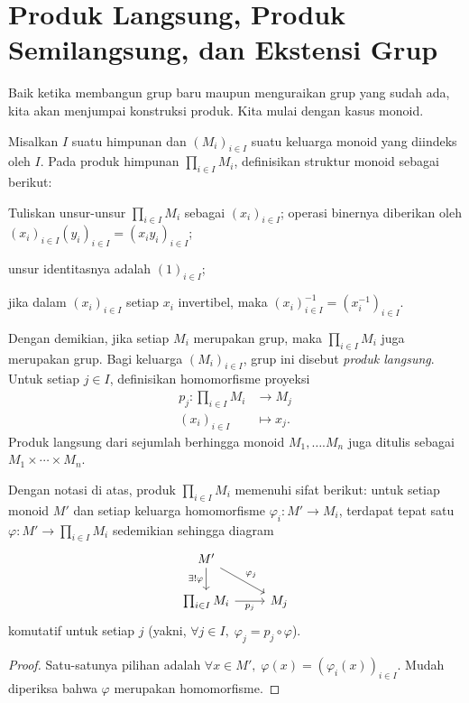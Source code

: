 \section{Produk Langsung, Produk Semilangsung, dan Ekstensi Grup}\label{sec:group-extensions}
Baik ketika membangun grup baru maupun menguraikan grup yang sudah ada, kita akan menjumpai konstruksi produk. Kita mulai dengan kasus monoid.

\begin{definition}\label{def:monoid-times}
	Misalkan $I$ suatu himpunan dan $(M_i)_{i \in I}$ suatu keluarga monoid yang diindeks oleh $I$. Pada produk himpunan $\prod_{i \in I} M_i$, definisikan struktur monoid sebagai berikut:
	\begin{compactitem}
		\item Tuliskan unsur-unsur $\prod_{i \in I} M_i$ sebagai $(x_i)_{i \in I}$; operasi binernya diberikan oleh $(x_i)_{i \in I} (y_i)_{i \in I} = (x_i y_i)_{i \in I}$;
		\item unsur identitasnya adalah $(1)_{i \in I}$;
		\item jika dalam $(x_i)_{i \in I}$ setiap $x_i$ invertibel, maka $(x_i)_{i \in I}^{-1} = (x_i^{-1})_{i \in I}$.
	\end{compactitem}
	Dengan demikian, jika setiap $M_i$ merupakan grup, maka $\prod_{i \in I} M_i$ juga merupakan grup. Bagi keluarga $(M_i)_{i \in I}$, grup ini disebut \emph{produk langsung}. Untuk setiap $j \in I$, definisikan homomorfisme proyeksi
	\begin{align*}
		p_j: \prod_{i \in I} M_i & \longrightarrow M_j \\
		(x_i)_{i \in I} & \longmapsto x_j.
	\end{align*}
	Produk langsung dari sejumlah berhingga monoid $M_1, \ldots. M_n$ juga ditulis sebagai $M_1 \times \cdots \times M_n$.
\end{definition}

\begin{lemma}\label{prop:product-monoid-univ-prop}
	Dengan notasi di atas, produk $\prod_{i \in I} M_i$ memenuhi sifat berikut: untuk setiap monoid $M'$ dan setiap keluarga homomorfisme $\varphi_i: M' \to M_i$, terdapat tepat satu $\varphi: M' \to \prod_{i \in I} M_i$ sedemikian sehingga diagram
	\[ \begin{tikzcd}
		M' \arrow[rd, "\varphi_j"] \arrow[d, "{\exists! \varphi}"'] & \\
		\prod_{i \in I} M_i \arrow[r, "p_j"'] & M_j
	\end{tikzcd} \]
	komutatif untuk setiap $j$ (yakni, $\forall j \in I, \; \varphi_j = p_j \circ \varphi$).
\end{lemma}
\begin{proof}
	Satu-satunya pilihan adalah $\forall x \in M', \; \varphi(x) = (\varphi_i(x))_{i \in I}$. Mudah diperiksa bahwa $\varphi$ merupakan homomorfisme.
\end{proof}

